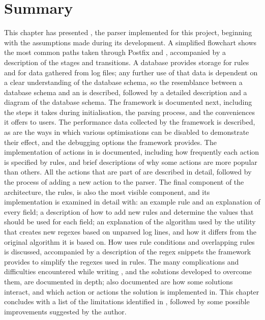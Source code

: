 \section{Summary}

This chapter has presented \parsername{}, the parser implemented for this
project, beginning with the assumptions made during its development.  A
simplified flowchart shows the most common paths taken through Postfix and
\parsername{}, accompanied by a description of the stages and transitions.
A database provides storage for rules and for data gathered from log files;
any further use of that data is dependent on a clear understanding of the
database schema, so the resemblance between a database schema and an
 is described, followed by a detailed description and a
diagram of the database schema.  The framework is documented next,
including the steps it takes during initialisation, the parsing process,
and the conveniences it offers to users.  The performance data collected by
the framework is described, as are the ways in which various optimisations
can be disabled to demonstrate their effect, and the debugging options the
framework provides.  The implementation of actions in \parsername{} is
documented, including how frequently each action is specified by rules, and
brief descriptions of why some actions are more popular than others.  All
the actions that are part of \parsername{} are described in detail,
followed by the process of adding a new action to the parser.  The final
component of the architecture, the rules, is also the most visible
component, and its implementation is examined in detail with: an example
rule and an explanation of every field; a description of how to add new
rules and determine the values that should be used for each field; an
explanation of the algorithm used by the utility that creates new regexes
based on unparsed log lines, and how it differs from the original algorithm
it is based on.  How \parsername{} uses rule conditions and overlapping
rules is discussed, accompanied by a description of the regex snippets the
framework provides to simplify the regexes used in rules.  The many
complications and difficulties encountered while writing \parsername{}, and
the solutions developed to overcome them, are documented in depth; also
documented are how some solutions interact, and which action or actions the
solution is implemented in.  This chapter concludes with a list of the
limitations identified in \parsername{}, followed by some possible
improvements suggested by the author.
